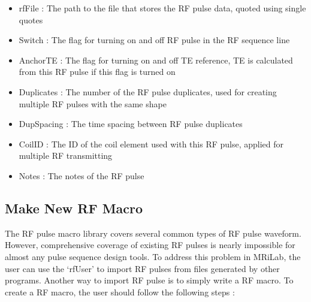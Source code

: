 \documentclass{book}%
\begin{document}
\begin{itemize}
	\item rfFile : The path to the file that stores the RF pulse data, quoted using single quotes
	\item Switch : The flag for turning on and off RF pulse in the RF sequence line
	\item AnchorTE : The flag for turning on and off TE reference, TE is calculated from this RF pulse if this flag is turned on
	\item Duplicates : The number of the RF pulse duplicates, used for creating multiple RF pulses with the same shape
	\item DupSpacing : The time spacing between RF pulse duplicates
	\item CoilID : The ID of the coil element used with this RF pulse, applied for multiple RF transmitting
	\item Notes : The notes of the RF pulse 
\end{itemize}

\subsection{Make New RF Macro}

The RF pulse macro library covers several common types of RF pulse waveform. However, comprehensive coverage of existing RF pulses is nearly impossible for almost any pulse sequence design tools. To address this problem in MRiLab, the user can use the `rfUser' to import RF pulses from files generated by other programs. Another way to import RF pulse is to simply write a RF macro. To create a RF macro, the user should follow the following steps :
\end{document}
